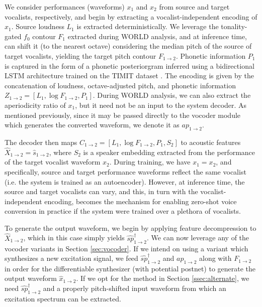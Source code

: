 \documentclass{article}
\begin{document}
\begin{sloppy}
We consider performances (waveforms) $x_1$ and $x_2$ from source and target vocalists, respectively, and begin by extracting a vocalist-independent encoding of $x_1$.  Source loudness $L_1$ is extracted deterministically.  We leverage the tonality-gated $f_0$ contour $F_1$ extracted during WORLD analysis, and at inference time, can shift it (to the nearest octave) considering the median pitch of the source of target vocalists, yielding the target pitch contour $F_{1\rightarrow2}$. Phonetic information $P_1$ is captured in the form of a phonetic posteriorgram inferred using a bidirectional LSTM architecture trained on the TIMIT dataset \cite{Timit}.  The encoding is given by the concatenation of loudness, octave-adjusted pitch, and phonetic information $Z_{1\rightarrow2} = \left[ L_1, \log{F_{1\rightarrow2}}, P_1 \right]$. During WORLD analysis, we can also extract the aperiodicity ratio of $x_1$, but it need not be an input to the system decoder.  As mentioned previously, since it may be passed directly to the vocoder module which generates the converted waveform, we denote it as ${ap}_{1\rightarrow2}$.

The decoder then maps $C_{1\rightarrow2} = \left[ L_1, \log{F_{1\rightarrow2}}, P_1, S_2 \right]$ to acoustic features $\hat{X}_{1\rightarrow2} = \hat{s}_{1\rightarrow2}$, where $S_2$ is a speaker embedding extracted from the performance of the target vocalist waveform $x_2$.  During training, we have $x_1=x_2$, and specifically, source and target performance waveforms reflect the same vocalist (i.e. the system is trained as an autoencoder).  However, at inference time, the source and target vocalists can vary, and this, in turn with the vocalist-independent encoding, becomes the mechanism for enabling zero-shot voice conversion in practice if the system were trained over a plethora of vocalists.

To generate the output waveform, we begin by applying feature decompression to $\hat{X}_{1\rightarrow2}$, which in this case simply yields $\hat{sp}^\dagger_{1\rightarrow2}$. We can now leverage any of the vocoder variants in Section {\ref{sec:vocoder}}.  If we intend on using a variant which synthesizes a new excitation signal, we feed $\hat{sp}^\dagger_{1\rightarrow2}$ and ${ap}_{1\rightarrow2}$ along with $F_{1\rightarrow2}$ in order for the differentiable synthesizer (with potential postnet) to generate the output waveform $\hat{x}_{1\rightarrow2}$.  If we opt for the method in Section \ref{ssec:alternate}, we need $\hat{sp}^\dagger_{1\rightarrow2}$ and a properly pitch-shifted input waveform from which an excitation spectrum can be extracted.


\end{sloppy}
\end{document}
